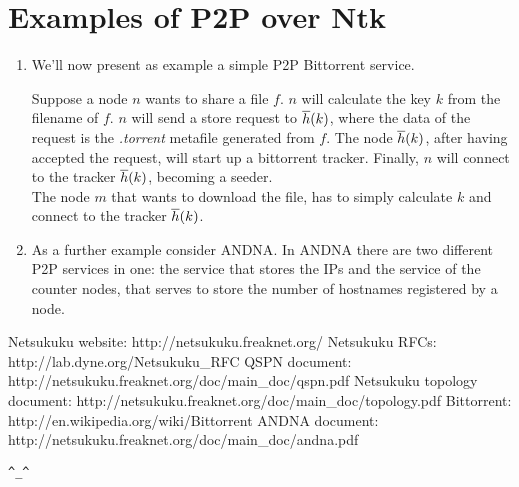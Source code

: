 \documentclass[a4paper]{article}
\newcommand{\href}[2]{ #1 }
\theoremstyle{definition}
\begin{document}
\section{Examples of P2P over Ntk}
\begin{enumerate}
	\item 
We'll now present as example a simple P2P Bittorrent\cite{bittorrent}
service.\\\newline

Suppose a node $n$ wants to share a file $f$.
$n$ will calculate the key $k$ from the filename of $f$. 
$n$ will send a store request to ${{\overline{h}}}(k)$, where the data of the
request is the \emph{.torrent} metafile generated from $f$.
The node ${{\overline{h}}}(k)$, after having accepted the request, will start up a
bittorrent tracker.
Finally, $n$ will connect to the tracker ${{\overline{h}}}(k)$, becoming a seeder.\\\newline
The node $m$ that wants to download the file, has to simply calculate $k$ and 
connect to the tracker ${{\overline{h}}}(k)$.
\item As a further example consider ANDNA\cite{andnadoc}. In ANDNA there are
	two different P2P services in one: the service that stores the IPs and
	the service of the counter nodes, that serves to store the number of
	hostnames registered by a node.
\end{enumerate}


\begin{thebibliography}{99}
	 Netsukuku website:
		\href{http://netsukuku.freaknet.org/}{http://netsukuku.freaknet.org/}
	 Netsukuku RFCs:
		\href{http://lab.dyne.org/Netsukuku\_RFC}{NTK RFCs}
	 QSPN document:
		\href{http://netsukuku.freaknet.org/doc/main\_doc/qspn.pdf}{qspn.pdf}
	 Netsukuku topology document:
		\href{http://netsukuku.freaknet.org/doc/main\_doc/topology.pdf}{topology.pdf}
	 Bittorrent:
		\href{http://en.wikipedia.org/wiki/Bittorrent}{Bittorrent}
	 ANDNA document:
		\href{http://netsukuku.freaknet.org/doc/main\_doc/andna.pdf}{andna.pdf}
\end{thebibliography}
\newpage

\begin{center}
\verb|^_^|
\end{center}
\end{document}
